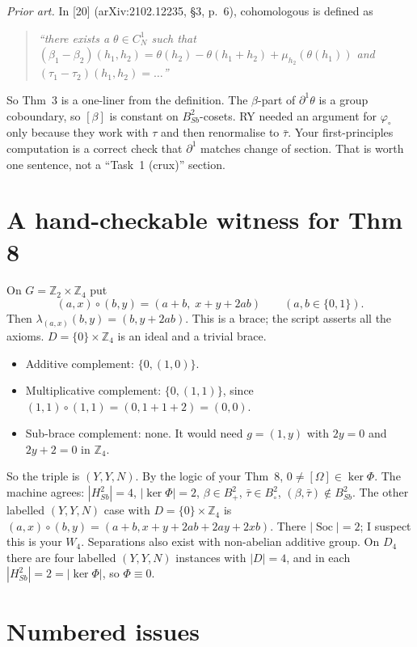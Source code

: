 \documentclass[11pt]{article}
\newcommand{\Z}{\mathbb{Z}}
\newcommand{\Soc}{\operatorname{Soc}}
\newenvironment{quoted}{\begin{quote}\small\itshape}{\end{quote}}
\begin{document}
\emph{Prior art.} In [20] (arXiv:2102.12235, \S3, p.~6), cohomologous is defined as
\begin{quoted}
``there exists a $\theta\in C^1_N$ such that $(\beta_1-\beta_2)(h_1,h_2)=\theta(h_2)-\theta(h_1+h_2)+\mu_{h_2}(\theta(h_1))$ and $(\tau_1-\tau_2)(h_1,h_2)=\ldots$''
\end{quoted}
So Thm~3 is a one-liner from the definition. The $\beta$-part of $\partial^1\theta$ is a
group coboundary, so $[\beta]$ is constant on $B^2_{Sb}$-cosets. RY needed an argument for
$\varphi_\circ$ only because they work with $\tau$ and then renormalise to $\bar\tau$. Your
first-principles computation is a correct check that $\partial^1$ matches change of section.
That is worth one sentence, not a ``Task~1 (crux)'' section.

\section*{A hand-checkable witness for Thm 8}
On $G=\Z_2\times\Z_4$ put
\[
(a,x)\circ(b,y)=(a+b,\;x+y+2ab)\qquad(a,b\in\{0,1\}).
\]
Then $\lambda_{(a,x)}(b,y)=(b,y+2ab)$. This is a brace; the script asserts all the axioms.
$D=\{0\}\times\Z_4$ is an ideal and a trivial brace.
\begin{itemize}[leftmargin=*]
\item Additive complement: $\{0,(1,0)\}$.
\item Multiplicative complement: $\{0,(1,1)\}$, since $(1,1)\circ(1,1)=(0,1+1+2)=(0,0)$.
\item Sub-brace complement: none. It would need $g=(1,y)$ with $2y=0$ and
  $2y+2=0$ in $\Z_4$.
\end{itemize}
So the triple is $(Y,Y,N)$. By the logic of your Thm~8,
$0\neq[\Omega]\in\ker\Phi$. The machine agrees: $|H^2_{Sb}|=4$, $|\ker\Phi|=2$,
$\beta\in B^2_+$, $\bar\tau\in B^2_\circ$, $(\beta,\bar\tau)\notin B^2_{Sb}$. The other
labelled $(Y,Y,N)$ case with $D=\{0\}\times\Z_4$ is
$(a,x)\circ(b,y)=(a+b,x+y+2ab+2ay+2xb)$. There $|\Soc|=2$; I suspect this is your $W_4$.
Separations also exist with non-abelian additive group. On $D_4$ there are four labelled
$(Y,Y,N)$ instances with $|D|=4$, and in each $|H^2_{Sb}|=2=|\ker\Phi|$, so $\Phi\equiv0$.

\section*{Numbered issues}
\end{document}
